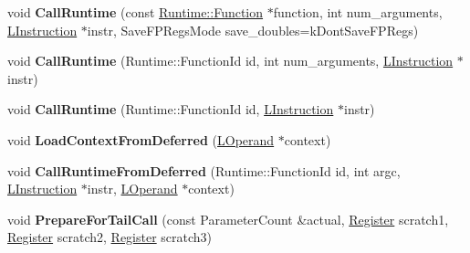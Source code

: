 \begin{DoxyCompactItemize}
\item 
void {\bfseries Call\+Runtime} (const \hyperlink{structv8_1_1internal_1_1_runtime_1_1_function}{Runtime\+::\+Function} $\ast$function, int num\+\_\+arguments, \hyperlink{classv8_1_1internal_1_1_l_instruction}{L\+Instruction} $\ast$instr, Save\+F\+P\+Regs\+Mode save\+\_\+doubles=k\+Dont\+Save\+F\+P\+Regs)\hypertarget{classv8_1_1internal_1_1_l_code_gen_ac9553032ed88d8b7b9a408c04124781f}{}\label{classv8_1_1internal_1_1_l_code_gen_ac9553032ed88d8b7b9a408c04124781f}

\item 
void {\bfseries Call\+Runtime} (Runtime\+::\+Function\+Id id, int num\+\_\+arguments, \hyperlink{classv8_1_1internal_1_1_l_instruction}{L\+Instruction} $\ast$instr)\hypertarget{classv8_1_1internal_1_1_l_code_gen_ac16bd03d079fe227358121f48075b4b7}{}\label{classv8_1_1internal_1_1_l_code_gen_ac16bd03d079fe227358121f48075b4b7}

\item 
void {\bfseries Call\+Runtime} (Runtime\+::\+Function\+Id id, \hyperlink{classv8_1_1internal_1_1_l_instruction}{L\+Instruction} $\ast$instr)\hypertarget{classv8_1_1internal_1_1_l_code_gen_a5a8eebd32428c2f6904e2875a4dbbb18}{}\label{classv8_1_1internal_1_1_l_code_gen_a5a8eebd32428c2f6904e2875a4dbbb18}

\item 
void {\bfseries Load\+Context\+From\+Deferred} (\hyperlink{classv8_1_1internal_1_1_l_operand}{L\+Operand} $\ast$context)\hypertarget{classv8_1_1internal_1_1_l_code_gen_a9009104c76636c80f382e04c1dd304ca}{}\label{classv8_1_1internal_1_1_l_code_gen_a9009104c76636c80f382e04c1dd304ca}

\item 
void {\bfseries Call\+Runtime\+From\+Deferred} (Runtime\+::\+Function\+Id id, int argc, \hyperlink{classv8_1_1internal_1_1_l_instruction}{L\+Instruction} $\ast$instr, \hyperlink{classv8_1_1internal_1_1_l_operand}{L\+Operand} $\ast$context)\hypertarget{classv8_1_1internal_1_1_l_code_gen_a4c3be7c7de6a86615c912e70cfc04ab4}{}\label{classv8_1_1internal_1_1_l_code_gen_a4c3be7c7de6a86615c912e70cfc04ab4}

\item 
void {\bfseries Prepare\+For\+Tail\+Call} (const Parameter\+Count \&actual, \hyperlink{structv8_1_1internal_1_1_register}{Register} scratch1, \hyperlink{structv8_1_1internal_1_1_register}{Register} scratch2, \hyperlink{structv8_1_1internal_1_1_register}{Register} scratch3)\hypertarget{classv8_1_1internal_1_1_l_code_gen_ac244b5f30d2995d51f6d263358a7ccd9}{}\label{classv8_1_1internal_1_1_l_code_gen_ac244b5f30d2995d51f6d263358a7ccd9}


\end{DoxyCompactItemize}
